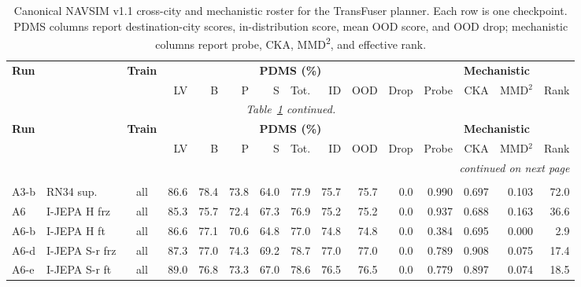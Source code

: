 \begingroup
\scriptsize
\setlength{\tabcolsep}{2.8pt}
\renewcommand{\arraystretch}{0.98}
\setlength{\LTleft}{0pt}
\setlength{\LTright}{0pt}

\begin{longtable}{@{}l>{\raggedright\arraybackslash}p{2.2cm}crrrrrrrrrrrr@{}}
\caption[Canonical NAVSIM v1.1 consolidated cross-city and mechanistic roster, TransFuser block.]{Canonical NAVSIM v1.1 cross-city and mechanistic roster for the TransFuser planner. Each row is one checkpoint. PDMS columns report destination-city scores, in-distribution score, mean OOD score, and OOD drop; mechanistic columns report probe, CKA, MMD\textsuperscript{2}, and effective rank.}\label{tab:navsim_pdms_merged_v11} \\
\toprule
\multirow{2}{*}{\textbf{Run}} & \multirow{2}{*}{\textbf{Backbone}} & \multirow{2}{*}{\textbf{Train}} & \multicolumn{8}{c}{\textbf{PDMS (\%)}} & \multicolumn{4}{c}{\textbf{Mechanistic}} \\
\cmidrule(lr){4-11}\cmidrule(lr){12-15}
& & & LV & B & P & S & Tot. & ID & OOD & Drop & Probe & CKA & MMD$^2$ & Rank \\
\midrule
\endfirsthead
\multicolumn{15}{c}{\textit{Table~\ref{tab:navsim_pdms_merged_v11} continued.}} \\
\toprule
\multirow{2}{*}{\textbf{Run}} & \multirow{2}{*}{\textbf{Backbone}} & \multirow{2}{*}{\textbf{Train}} & \multicolumn{8}{c}{\textbf{PDMS (\%)}} & \multicolumn{4}{c}{\textbf{Mechanistic}} \\
\cmidrule(lr){4-11}\cmidrule(lr){12-15}
& & & LV & B & P & S & Tot. & ID & OOD & Drop & Probe & CKA & MMD$^2$ & Rank \\
\midrule
\endhead
\midrule
\multicolumn{15}{r}{\textit{continued on next page}} \\
\endfoot
\bottomrule
\endlastfoot
\multicolumn{15}{@{}l}{\textbf{All-city training}} \\
A3-b & RN34 sup. & all & 86.6 & 78.4 & 73.8 & 64.0 & 77.9 & 75.7 & 75.7 & 0.0 & 0.990 & 0.697 & 0.103 & 72.0 \\
A6 & I-JEPA H frz & all & 85.3 & 75.7 & 72.4 & 67.3 & 76.9 & 75.2 & 75.2 & 0.0 & 0.937 & 0.688 & 0.163 & 36.6 \\
A6-b & I-JEPA H ft & all & 86.6 & 77.1 & 70.6 & 64.8 & 77.0 & 74.8 & 74.8 & 0.0 & 0.384 & 0.695 & 0.000 & 2.9 \\
A6-d & I-JEPA S-r frz & all & 87.3 & 77.0 & 74.3 & 69.2 & 78.7 & 77.0 & 77.0 & 0.0 & 0.789 & 0.908 & 0.075 & 17.4 \\
A6-e & I-JEPA S-r ft & all & 89.0 & 76.8 & 73.3 & 67.0 & 78.6 & 76.5 & 76.5 & 0.0 & 0.779 & 0.897 & 0.074 & 18.5 \\

\end{longtable}
